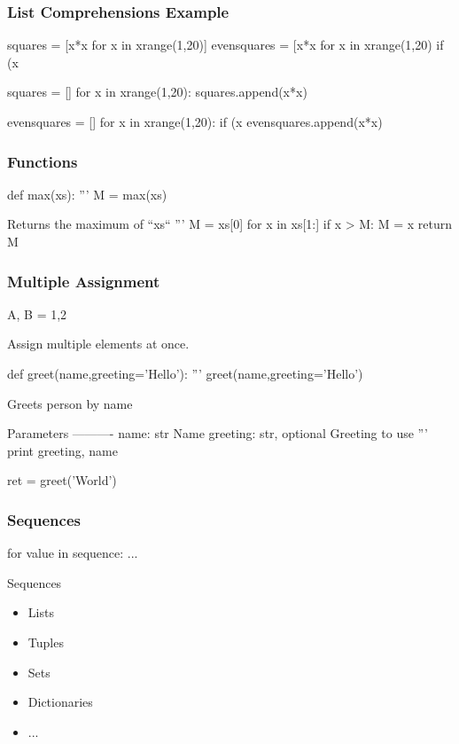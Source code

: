 \begin{frame}[fragile]
\frametitle{List Comprehensions Example}

\begin{python}
squares = [x*x for x in xrange(1,20)]
evensquares = [x*x for x in xrange(1,20) if (x%
\end{python}

\begin{python}
squares = []
for x in xrange(1,20):
    squares.append(x*x)

evensquares = []
for x in xrange(1,20):
    if (x%
        evensquares.append(x*x)
\end{python}

\end{frame}

\begin{frame}[fragile]
\frametitle{Functions}

\begin{python}
def max(xs):
    '''
    M = max(xs)

    Returns the maximum of ``xs``
    '''
    M = xs[0]
    for x in xs[1:]
        if x > M:
            M = x
    return M
\end{python}

\end{frame}


\begin{frame}[fragile]
\frametitle{Multiple Assignment}

\begin{python}
A, B = 1,2
\end{python}

Assign multiple elements at once.
\end{frame}

\begin{frame}[fragile]

\begin{python}
def greet(name,greeting='Hello'):
    '''
    greet(name,greeting='Hello')

    Greets person by name

    Parameters
    ----------
    name: str
        Name
    greeting: str, optional
        Greeting to use
    '''
    print greeting, name

ret = greet('World')

\end{python}

\end{frame}

\begin{frame}[fragile]
\frametitle{Sequences}

\begin{python}
for value in sequence:
    ...
\end{python}

\begin{block}{Sequences}
\begin{itemize}
\item Lists
\item Tuples
\item Sets
\item Dictionaries
\item ...
\end{itemize}
\end{block}
\end{frame}



